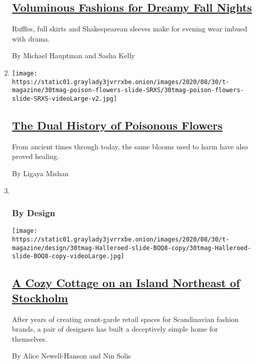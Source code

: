 \begin{enumerate}
{  \subsection{\texorpdfstring{\href{/2020/08/27/t-magazine/fall-womens-fashion-silhouettes.html}{Voluminous
  Fashions for Dreamy Fall
  Nights}}{Voluminous Fashions for Dreamy Fall Nights}}\label{voluminous-fashions-for-dreamy-fall-nights}}

  Ruffles, full skirts and Shakespearean sleeves make for evening wear
  imbued with drama.

  By Michael Hauptman and Sasha Kelly
\item
  \texttt{[image: https://static01.graylady3jvrrxbe.onion/images/2020/08/30/t-magazine/30tmag-poison-flowers-slide-SRXS/30tmag-poison-flowers-slide-SRXS-videoLarge-v2.jpg]}

  \hypertarget{the-dual-history-of-poisonous-flowers}{%
  \subsection{\texorpdfstring{\href{/2020/08/27/t-magazine/poisonous-flowers-healing-plants.html}{The
  Dual History of Poisonous
  Flowers}}{The Dual History of Poisonous Flowers}}\label{the-dual-history-of-poisonous-flowers}}

  From ancient times through today, the same blooms used to harm have
  also proved healing.

  By Ligaya Mishan
\item ~
  \hypertarget{by-design}{%
  \subsubsection{By Design}\label{by-design}}

  \texttt{[image: https://static01.graylady3jvrrxbe.onion/images/2020/08/30/t-magazine/design/30tmag-Halleroed-slide-BOQ8-copy/30tmag-Halleroed-slide-BOQ8-copy-videoLarge.jpg]}

  \hypertarget{a-cozy-cottage-on-an-island-northeast-of-stockholm}{%
  \subsection{\texorpdfstring{\href{/2020/08/26/t-magazine/cottage-stockholm-home-design.html}{A
  Cozy Cottage on an Island Northeast of
  Stockholm}}{A Cozy Cottage on an Island Northeast of Stockholm}}\label{a-cozy-cottage-on-an-island-northeast-of-stockholm}}

  After years of creating avant-garde retail spaces for Scandinavian
  fashion brands, a pair of designers has built a deceptively simple
  home for themselves.

  By Alice Newell-Hanson and Nin Solis
\end{enumerate}

